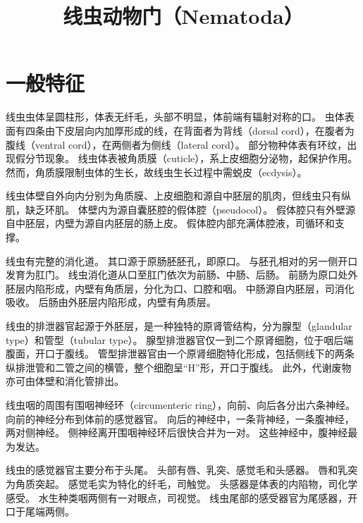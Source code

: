 \documentclass[11pt]{article}
\title{线虫动物门（Nematoda）}
\date{}
\begin{document}
  \maketitle

  \linenumbers
  
\section{一般特征}
线虫虫体呈圆柱形，体表无纤毛，头部不明显，体前端有辐射对称的口。
虫体表面有四条由下皮层向内加厚形成的线，在背面者为背线（dorsal cord），在腹者为腹线（ventral cord），在两侧者为侧线（lateral cord）。
部分物种体表有环纹，出现假分节现象。
线虫体表被角质膜（cuticle），系上皮细胞分泌物，起保护作用。
然而，角质膜限制虫体的生长，故线虫生长过程中需蜕皮（ecdysis）。

\newline

线虫体壁自外向内分别为角质膜、上皮细胞和源自中胚层的肌肉，但线虫只有纵肌，缺乏环肌。
体壁内为源自囊胚腔的假体腔（pseudocol）。
假体腔只有外壁源自中胚层，内壁为源自内胚层的肠上皮。
假体腔内部充满体腔液，司循环和支撑。

\newline

线虫有完整的消化道。
其口源于原肠胚胚孔，即原口。
与胚孔相对的另一侧开口发育为肛门。
线虫消化道从口至肛门依次为前肠、中肠、后肠。
前肠为原口处外胚层内陷形成，内壁有角质层，分化为口、口腔和咽。
中肠源自内胚层，司消化吸收。
后肠由外胚层内陷形成，内壁有角质层。

\newline

线虫的排泄器官起源于外胚层，是一种独特的原肾管结构，分为腺型（glandular type）和管型（tubular type）。
腺型排泄器官仅一到二个原肾细胞，位于咽后端腹面，开口于腹线。
管型排泄器官由一个原肾细胞特化形成，包括侧线下的两条纵排泄管和二管之间的横管，整个细胞呈“H”形，开口于腹线。
此外，代谢废物亦可由体壁和消化管排出。

\newline

线虫咽的周围有围咽神经环（circumenteric ring），向前、向后各分出六条神经。
向前的神经分布到体前的感觉器官。
向后的神经中，一条背神经，一条腹神经，两对侧神经。
侧神经离开围咽神经环后很快合并为一对。
这些神经中，腹神经最为发达。

\newline

线虫的感觉器官主要分布于头尾。
头部有唇、乳突、感觉毛和头感器。
唇和乳突为角质突起。
感觉毛实为特化的纤毛，司触觉。
头感器是体表的内陷物，司化学感受。
水生种类咽两侧有一对眼点，司视觉。
线虫尾部的感受器官为尾感器，开口于尾端两侧。
\end{document}
